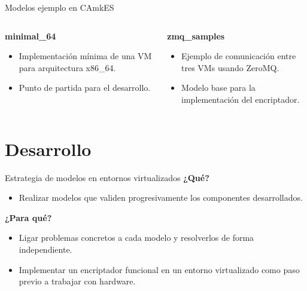 \documentclass[serif, aspectratio=169]{beamer}
\begin{document}
\begin{frame}{Modelos ejemplo en CAmkES}
    \begin{columns}[T]
        \begin{column}{0.43\textwidth}
            \textbf{minimal\_64}
            \begin{itemize}
                \item Implementación mínima de una VM para arquitectura x86\_64.
                \item Punto de partida para el desarrollo.
            \end{itemize}
        \end{column}

        \begin{column}{0.43\textwidth}
            \textbf{zmq\_samples}
            \begin{itemize}
                \item Ejemplo de comunicación entre tres VMs usando ZeroMQ.
                \item Modelo base para la implementación del encriptador.
            \end{itemize}
        \end{column}
    \end{columns}
    
\end{frame}

\section{Desarrollo}

\begin{frame}{Estrategia de modelos en entornos virtualizados}
       \textbf{¿Qué?} 
       \begin{itemize}
        \item Realizar modelos que validen progresivamente los componentes desarrollados.
       \end{itemize}
       
       \vspace*{0.5cm}
       \textbf{¿Para qué?} 
       \begin{itemize}
        \item Ligar problemas concretos a cada modelo y resolverlos de forma independiente.
        \item Implementar un encriptador funcional en un entorno virtualizado como paso previo a trabajar con hardware.
       \end{itemize}
       
\end{frame}
\end{document}
